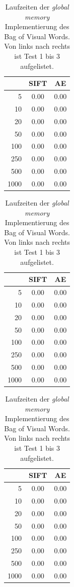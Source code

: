 \begin{table}
    \hfill
    \begin{tabular}[t]{ | r | c | c |}
    \hline
	     & SIFT & AE \\ \hline    
    5    & 0.00 & 0.00 \\ \hline
    10   & 0.00 & 0.00 \\ \hline
    20   & 0.00 & 0.00 \\ \hline
    50   & 0.00 & 0.00 \\ \hline
    100  & 0.00 & 0.00 \\ \hline
	250  & 0.00 & 0.00 \\ \hline
	500  & 0.00 & 0.00 \\ \hline
	1000 & 0.00 & 0.00 \\ \hline  
    \end{tabular}
    \hfill
    \begin{tabular}[t]{ | r | c | c |}
    \hline
	     & SIFT & AE \\ \hline    
    5    & 0.00 & 0.00 \\ \hline
    10   & 0.00 & 0.00 \\ \hline
    20   & 0.00 & 0.00 \\ \hline
    50   & 0.00 & 0.00 \\ \hline
    100  & 0.00 & 0.00 \\ \hline
	250  & 0.00 & 0.00 \\ \hline
	500  & 0.00 & 0.00 \\ \hline
	1000 & 0.00 & 0.00 \\ \hline    
    \end{tabular}
    \hfill
    \begin{tabular}[t]{ | r | c | c |}
    \hline
	     & SIFT & AE \\ \hline    
    5    & 0.00 & 0.00 \\ \hline
    10   & 0.00 & 0.00 \\ \hline
    20   & 0.00 & 0.00 \\ \hline
    50   & 0.00 & 0.00 \\ \hline
    100  & 0.00 & 0.00 \\ \hline
	250  & 0.00 & 0.00 \\ \hline
	500  & 0.00 & 0.00 \\ \hline
	1000 & 0.00 & 0.00 \\ \hline    
    \end{tabular}
    \hfill
	\caption{Laufzeiten der \textit{global memory} Implementierung des Bag of Visual Words. Von links nach rechts ist Test 1 bis 3 aufgelistet.}
\end{table}

